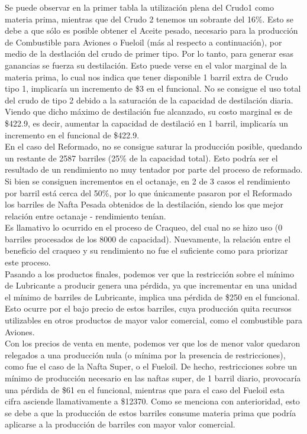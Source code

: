 \documentclass[a4paper,10pt]{article}
\begin{document}
Se puede observar en la primer tabla la utilizaci\'on plena del Crudo1 como materia prima, mientras que del Crudo 2 tenemos un sobrante del 16\%. Esto se debe a que s\'olo es posible obtener el Aceite pesado, necesario para la producci\'on de Combustible para Aviones o Fueloil (m\'as al respecto a continuaci\'on), por medio de la destlaci\'on del crudo de primer tipo. Por lo tanto, para generar esas ganancias se fuerza su destilaci\'on. Esto puede verse en el valor marginal de la materia prima, lo cual nos indica que tener disponible 1 barril extra de Crudo tipo 1, implicar\'ia un incremento de \$3 en el funcional.
No se consigue el uso total del crudo de tipo 2 debido a la saturaci\'on de la capacidad de destilaci\'on diaria.
Viendo que dicho m\'aximo de destilaci\'on fue alcanzado, su costo marginal es de \$422.9, es decir, aumentar la capacidad de destilaci\'o en 1 barril, implicar\'ia un incremento en el funcional de \$422.9. 
\\
En el caso del Reformado, no se consigue saturar la producci\'on posible, quedando un restante de 2587 barriles (25\% de la capacidad total). Esto podr\'ia ser el resultado de un rendimiento no muy tentador por parte del proceso de reformado. Si bien se consiguen incrementos en el octanaje, en 2 de 3 casos el rendimiento por barril está cerca del 50\%, por lo que \'unicamente pasaron por el Reformado los barriles de Nafta Pesada obtenidos de la destilaci\'on, siendo los que mejor relaci\'on entre octanaje - rendimiento ten\'ian.
\\
Es llamativo lo ocurrido en el proceso de Craqueo, del cual no se hizo uso (0 barriles procesados de los 8000 de capacidad). Nuevamente, la relaci\'on entre el beneficio del craqueo y su rendimiento no fue el suficiente como para priorizar este proceso. 
\\

Pasando a los productos finales, podemos ver que la restricci\'on sobre el m\'inimo de Lubricante a producir genera una p\'erdida, ya que incrementar en una unidad el m\'inimo de barriles de Lubricante, implica una p\'erdida de \$250 en el funcional. Esto ocurre por el bajo precio de estos barriles, cuya producci\'on quita recursos utilizables en otros productos de mayor valor comercial, como el combustible para Aviones.
\\

Con los precios de venta en mente, podemos ver que los de menor valor quedaron relegados a una producci\'on nula (o m\'inima por la presencia de restricciones), como fue el caso de la Nafta Super, o el Fueloil. De hecho, restricciones sobre un m\'inimo de producci\'on necesario en las naftas super, de 1 barril diario, provocar\'ia una p\'erdida de \$61 en el funcional, mientras que para el caso del Fueloil esta cifra asciende llamativamente a \$12370. Como se menciona con anterioridad, esto se debe a que la producci\'on de estos barriles consume materia prima que podr\'ia aplicarse a la producci\'on de barriles con mayor valor comercial. 
\\
\end{document}
